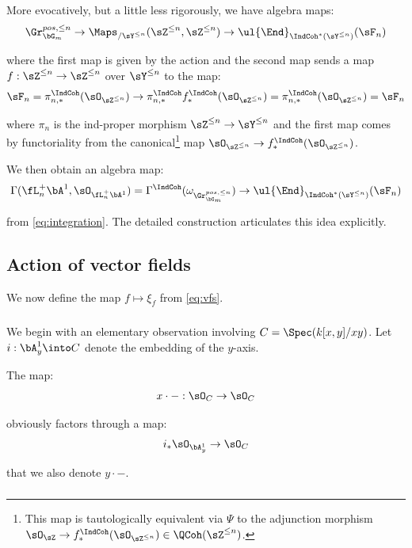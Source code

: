 \begin{rem}
\notready

More evocatively, but a little less rigorously, we have algebra maps:
%
\[
\Gr_{\bG_m}^{pos,\leq n} \to \Maps_{/\sY^{\leq n}}(\sZ^{\leq n},\sZ^{\leq n}) \to
\ul{\End}_{\IndCoh^*(\sY^{\leq n})}(\sF_n)
\]

 where the first map is given by the action and the second
map sends a map $f:\sZ^{\leq n} \to \sZ^{\leq n}$ over $\sY^{\leq n}$
to the map:
%
\[
\sF_n = \pi_{n,*}^{\IndCoh}(\sO_{\sZ^{\leq n}})
\to \pi_{n,*}^{\IndCoh}f_*^{\IndCoh}(\sO_{\sZ^{\leq n}}) =
\pi_{n,*}^{\IndCoh}(\sO_{\sZ^{\leq n}}) = \sF_n
\]

 where $\pi_n$ is the ind-proper morphism $\sZ^{\leq n} \to \sY^{\leq n}$
and the first map comes by functoriality from the canonical\footnote{This
map is tautologically equivalent via $\Psi$ to the adjunction morphism
$\sO_{\sZ} \to f_*^{\IndCoh}(\sO_{\sZ^{\leq n}}) \in \QCoh(\sZ^{\leq n})$.}
map $\sO_{\sZ^{\leq n}} \to f_*^{\IndCoh}(\sO_{\sZ^{\leq n}})$.

We then obtain an algebra map:
%
\[
\Gamma(\fL_n^+ \bA^1,\sO_{\fL_n^+ \bA^1}) =
\Gamma^{\IndCoh}(\omega_{\Gr_{\bG_m}^{pos,\leq n}}) \to
\ul{\End}_{\IndCoh^*(\sY^{\leq n})}(\sF_n)
\]

 from \eqref{eq:integration}. The detailed construction articulates
this idea explicitly.

\end{rem}

\subsection{Action of vector fields}

We now define the map $f \mapsto \xi_f$ from
\eqref{eq:vfs}.

\subsubsection{}

We begin with an elementary observation
involving $C = \Spec(k[x,y]/xy)$.
Let $i:\bA_y^1 \into C$ denote the
embedding of the $y$-axis.

The map:
%
\[
x\cdot-:\sO_C \to \sO_C
\]

 obviously factors through a map:
%
\[
i_*\sO_{\bA_y^1} \to \sO_C
\]

 that we also denote $y \cdot -$.

\subsubsection{}\label{ss:c-ind}

